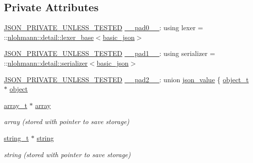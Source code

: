 \subsection*{Private Attributes}
\begin{DoxyCompactItemize}
\item 
\hyperlink{json_8hpp_a2cf645f34610e7f7d6e09ab88a2ab917}{J\+S\+O\+N\+\_\+\+P\+R\+I\+V\+A\+T\+E\+\_\+\+U\+N\+L\+E\+S\+S\+\_\+\+T\+E\+S\+T\+ED} \hyperlink{classnlohmann_1_1basic__json_a501740b004225f4c948e657c9e6e539e}{\+\_\+\+\_\+pad0\+\_\+\+\_\+}\+: using lexer = \+::\hyperlink{classnlohmann_1_1detail_1_1lexer__base}{nlohmann\+::detail\+::lexer\+\_\+base}$<$\hyperlink{classnlohmann_1_1basic__json}{basic\+\_\+json}$>$
\item 
\hyperlink{json_8hpp_a2cf645f34610e7f7d6e09ab88a2ab917}{J\+S\+O\+N\+\_\+\+P\+R\+I\+V\+A\+T\+E\+\_\+\+U\+N\+L\+E\+S\+S\+\_\+\+T\+E\+S\+T\+ED} \hyperlink{classnlohmann_1_1basic__json_a834674252ca19c65b24963d28eb8932d}{\+\_\+\+\_\+pad1\+\_\+\+\_\+}\+: using serializer = \+::\hyperlink{classnlohmann_1_1detail_1_1serializer}{nlohmann\+::detail\+::serializer}$<$\hyperlink{classnlohmann_1_1basic__json}{basic\+\_\+json}$>$
\item 
\hyperlink{json_8hpp_a2cf645f34610e7f7d6e09ab88a2ab917}{J\+S\+O\+N\+\_\+\+P\+R\+I\+V\+A\+T\+E\+\_\+\+U\+N\+L\+E\+S\+S\+\_\+\+T\+E\+S\+T\+ED} \hyperlink{classnlohmann_1_1basic__json_ab85f42065b70594c15de42e1f0870fba}{\+\_\+\+\_\+pad2\+\_\+\+\_\+}\+: union \hyperlink{classnlohmann_1_1basic__json_abcfe744b08e2cd81508ce9bf7ebc86cf}{json\+\_\+value} \{ \hyperlink{classnlohmann_1_1basic__json_a5e3df077f880583a96d74cd63e173cb2}{object\+\_\+t}$\ast$ \hyperlink{classnlohmann_1_1basic__json_a9a4df356e05415438fadf8a15e583903}{object}
\item 
\hyperlink{classnlohmann_1_1basic__json_a53700c308d804f84aea5ff05abb2ac4e}{array\+\_\+t} $\ast$ \hyperlink{classnlohmann_1_1basic__json_ad2b075c694e4564c9742d2c8db7c7c5f}{array}
\begin{DoxyCompactList}\small\item\em array (stored with pointer to save storage) \end{DoxyCompactList}\item 
\hyperlink{classnlohmann_1_1basic__json_a33593865ffb1860323dcbd52425b90c8}{string\+\_\+t} $\ast$ \hyperlink{classnlohmann_1_1basic__json_ac32019eb29dc7bb4c326a233e0e2f0cb}{string}
\begin{DoxyCompactList}\small\item\em string (stored with pointer to save storage) \end{DoxyCompactList}\item 

\end{DoxyCompactItemize}
